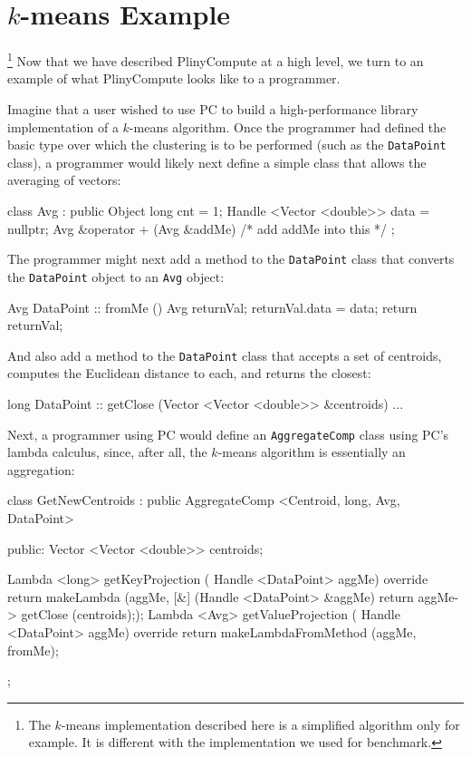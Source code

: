 \section{$k$-means Example}\footnote{The $k$-means implementation
    described here is a simplified algorithm only for example. It is
    different with the implementation we used for benchmark.}
\label{sec:example}
Now that we have described PlinyCompute at a high level, we turn to an
example of what PlinyCompute looks like to a programmer.

Imagine that a user wished to use PC to build a high-performance
library implementation of a $k$-means algorithm.
Once the programmer had defined the basic type over which the clustering is to be performed (such as the
\texttt{DataPoint} class), 
a programmer would likely next define a simple class that allows the averaging of vectors:

\begin{codesmall}
class Avg : public Object {
	long cnt = 1;
	Handle <Vector <double>> data = nullptr;
	Avg &operator + (Avg &addMe)
           {/* add addMe into this */}
};
\end{codesmall}

\noindent
The programmer might next add a method to the \texttt{DataPoint} class that converts the \texttt{DataPoint} object to an \texttt{Avg} object:

\begin{codesmall}
Avg DataPoint :: fromMe () {
	Avg returnVal;
	returnVal.data = data;
	return returnVal;
}
\end{codesmall}

\noindent
And also add a method to the \texttt{DataPoint} class that accepts a set of centroids, computes the Euclidean distance to
each, and returns the closest:

\begin{codesmall}
long DataPoint :: getClose (Vector <Vector <double>> 
        &centroids) {...}
\end{codesmall}

\noindent
Next, a programmer using PC would define an \texttt{AggregateComp} class using PC's lambda calculus, since, after all, the $k$-means algorithm is essentially 
an aggregation:

\begin{codesmall}
class GetNewCentroids : public AggregateComp 
    <Centroid, long, Avg, DataPoint> {

public:
   Vector <Vector <double>> centroids;

   Lambda <long> getKeyProjection (
       Handle <DataPoint> aggMe) override {
          return makeLambda (aggMe, 
              [&] (Handle <DataPoint> &aggMe) 
                 {return aggMe->
                     getClose (centroids);});
   }
   Lambda <Avg> getValueProjection (
       Handle <DataPoint> aggMe) override {
          return makeLambdaFromMethod 
              (aggMe, fromMe);
   }
};
\end{codesmall}

